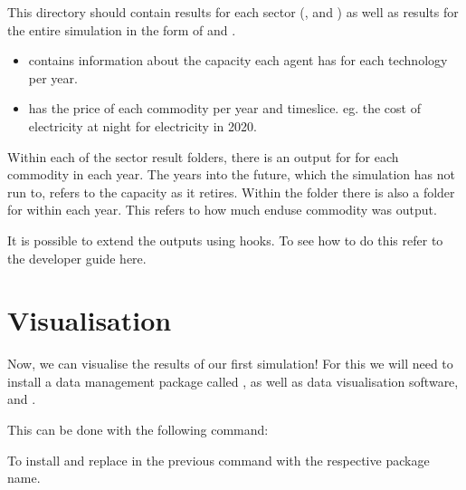 \documentclass[letterpaper,10pt,english]{sphinxmanual}
\begin{document}
This directory should contain results for each sector (, and ) as well as results for the entire simulation in the form of  and .
\begin{itemize}
\item {} 
 contains information about the capacity each agent has for each technology per year.

\item {} 
 has the price of each commodity per year and timeslice. eg. the cost of electricity at night for electricity in 2020.

\end{itemize}

Within each of the sector result folders, there is an output for  for each commodity in each year. The years into the future, which the simulation has not run to, refers to the capacity as it retires. Within the  folder there is also a folder for  within each year. This refers to how much end\sphinxhyphen{}use commodity was output.

It is possible to extend the outputs using hooks. To see how to do this refer to the developer guide here.


\section{Visualisation}
\label{\detokenize{running-muse-example:Visualisation}}
Now, we can visualise the results of our first simulation! For this we will need to install a data management package called , as well as data visualisation software,  and .

This can be done with the following command:


To install  and  replace  in the previous command with the respective package name.
\end{document}

